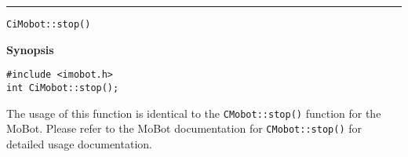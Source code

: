 \noindent
\vspace{5pt}
\rule{6.5in}{0.015in}
\noindent
{\LARGE \texttt{CiMobot::stop()}}\\
{}

\noindent
{\bf Synopsis}\\
\begin{verbatim}
#include <imobot.h>
int CiMobot::stop();
\end{verbatim}

The usage of this function is identical to the
\texttt{CMobot::stop()} function for the MoBot.
Please refer to the MoBot documentation for \texttt{CMobot::stop()} for
detailed usage documentation.

